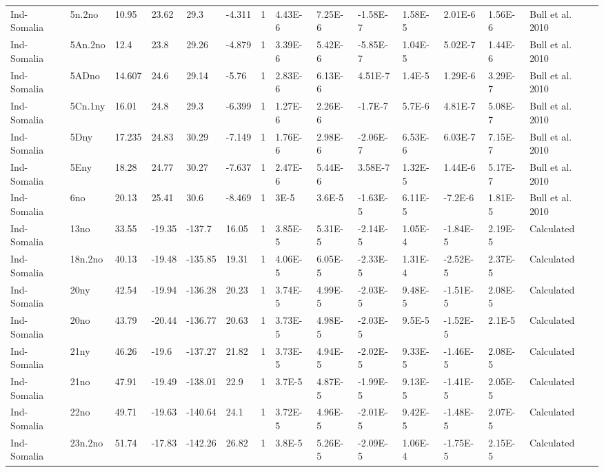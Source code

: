 \begin{landscape}
\begin{longtable}{@{}lllllllllllllp{3.5cm}@{}}
Ind-Somalia & 5n.2no & 10.95 & 23.62 & 29.3 & -4.311 & 1 & 4.43E-6 & 7.25E-6 & -1.58E-7 & 1.58E-5 & 2.01E-6 & 1.56E-6 & Bull et al. 2010 \\
Ind-Somalia & 5An.2no & 12.4 & 23.8 & 29.26 & -4.879 & 1 & 3.39E-6 & 5.42E-6 & -5.85E-7 & 1.04E-5 & 5.02E-7 & 1.44E-6 & Bull et al. 2010 \\
Ind-Somalia & 5ADno & 14.607 & 24.6 & 29.14 & -5.76 & 1 & 2.83E-6 & 6.13E-6 & 4.51E-7 & 1.4E-5 & 1.29E-6 & 3.29E-7 & Bull et al. 2010 \\
Ind-Somalia & 5Cn.1ny & 16.01 & 24.8 & 29.3 & -6.399 & 1 & 1.27E-6 & 2.26E-6 & -1.7E-7 & 5.7E-6 & 4.81E-7 & 5.08E-7 & Bull et al. 2010 \\
Ind-Somalia & 5Dny & 17.235 & 24.83 & 30.29 & -7.149 & 1 & 1.76E-6 & 2.98E-6 & -2.06E-7 & 6.53E-6 & 6.03E-7 & 7.15E-7 & Bull et al. 2010 \\
Ind-Somalia & 5Eny & 18.28 & 24.77 & 30.27 & -7.637 & 1 & 2.47E-6 & 5.44E-6 & 3.58E-7 & 1.32E-5 & 1.44E-6 & 5.17E-7 & Bull et al. 2010 \\
Ind-Somalia & 6no & 20.13 & 25.41 & 30.6 & -8.469 & 1 & 3E-5 & 3.6E-5 & -1.63E-5 & 6.11E-5 & -7.2E-6 & 1.81E-5 & Bull et al. 2010 \\
Ind-Somalia & 13no & 33.55 & -19.35 & -137.7 & 16.05 & 1 & 3.85E-5 & 5.31E-5 & -2.14E-5 & 1.05E-4 & -1.84E-5 & 2.19E-5 & Calculated \\
Ind-Somalia & 18n.2no & 40.13 & -19.48 & -135.85 & 19.31 & 1 & 4.06E-5 & 6.05E-5 & -2.33E-5 & 1.31E-4 & -2.52E-5 & 2.37E-5 & Calculated \\
Ind-Somalia & 20ny & 42.54 & -19.94 & -136.28 & 20.23 & 1 & 3.74E-5 & 4.99E-5 & -2.03E-5 & 9.48E-5 & -1.51E-5 & 2.08E-5 & Calculated \\
Ind-Somalia & 20no & 43.79 & -20.44 & -136.77 & 20.63 & 1 & 3.73E-5 & 4.98E-5 & -2.03E-5 & 9.5E-5 & -1.52E-5 & 2.1E-5 & Calculated \\
Ind-Somalia & 21ny & 46.26 & -19.6 & -137.27 & 21.82 & 1 & 3.73E-5 & 4.94E-5 & -2.02E-5 & 9.33E-5 & -1.46E-5 & 2.08E-5 & Calculated \\
Ind-Somalia & 21no & 47.91 & -19.49 & -138.01 & 22.9 & 1 & 3.7E-5 & 4.87E-5 & -1.99E-5 & 9.13E-5 & -1.41E-5 & 2.05E-5 & Calculated \\
Ind-Somalia & 22no & 49.71 & -19.63 & -140.64 & 24.1 & 1 & 3.72E-5 & 4.96E-5 & -2.01E-5 & 9.42E-5 & -1.48E-5 & 2.07E-5 & Calculated \\
Ind-Somalia & 23n.2no & 51.74 & -17.83 & -142.26 & 26.82 & 1 & 3.8E-5 & 5.26E-5 & -2.09E-5 & 1.06E-4 & -1.75E-5 & 2.15E-5 & Calculated \\

\end{longtable}
\end{landscape}
